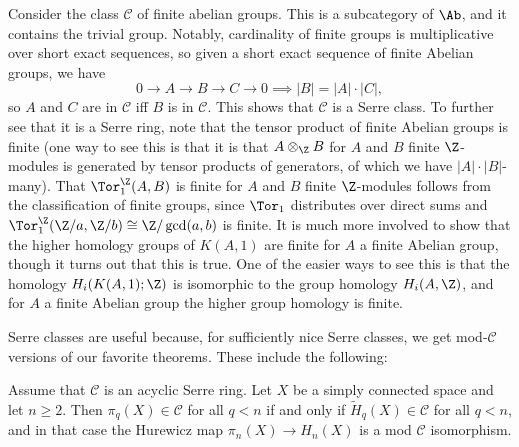 \begin{example}
    Consider the class $\mathscr C$ of finite abelian groups. This is a subcategory of $\Ab$, and it contains the trivial group. Notably, cardinality of finite groups is multiplicative over short exact sequences, so given a short exact sequence of finite Abelian groups, we have
    \[0\to A\to B\to C\to 0\implies |B|=|A|\cdot|C|,\]
    so $A$ and $C$ are in $\mathscr C$ iff $B$ is in $\mathscr C$. This shows that $\mathscr C$ is a Serre class. To further see that it is a Serre ring, note that the tensor product of finite Abelian groups is finite (one way to see this is that it is that $A\otimes_\Z B$ for $A$ and $B$ finite $\Z$-modules is generated by tensor products of generators, of which we have $|A|\cdot |B|$-many). That  $\Tor_1^\Z(A,B)$ is finite for $A$ and $B$ finite $\Z$-modules follows from the classification of finite groups, since $\Tor_1$ distributes over direct sums and $\Tor_1^\Z(\Z/a,\Z/b)\cong \Z/\gcd(a,b)$ is finite. It is much more involved to show that the higher homology groups of $K(A,1)$ are finite for $A$ a finite Abelian group, though it turns out that this is true. One of the easier ways to see this is that the homology $H_i(K(A,1);\Z)$ is isomorphic to the group homology $H_i(A,\Z)$, and for $A$ a finite Abelian group the higher group homology is finite.
    \end{example}

Serre classes are useful because, for sufficiently nice Serre classes, we get mod-$\mathscr C$ versions of our favorite theorems. These include the following:
\begin{theorem}
    Assume that $\mathscr{C}$ is an acyclic Serre ring. Let $X$ be a simply connected space and let $n \geq 2$. Then $\pi_q(X) \in \mathscr{C}$ for all $q < n$ if and only if $\widetilde{H}_q(X) \in \mathscr{C}$ for all $q < n$, and in that case the Hurewicz map $\pi_n(X) \to H_n(X)$ is a mod $\mathscr{C}$ isomorphism.
\end{theorem}


